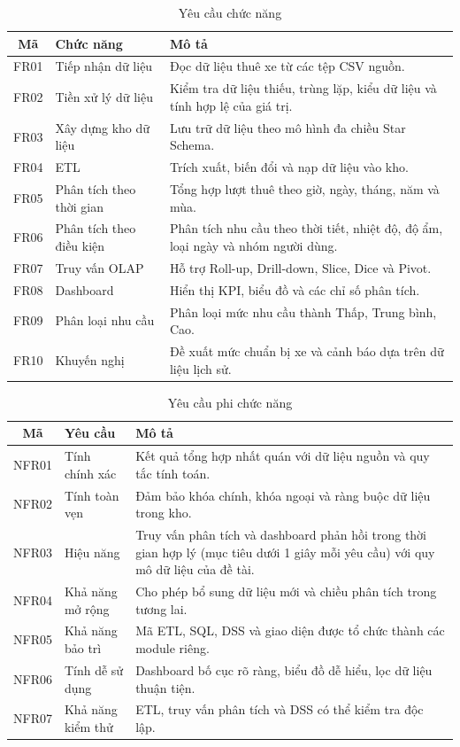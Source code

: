 \begin{table}[H]
\centering
\caption{Yêu cầu chức năng}
\label{tab:fr}
\begin{tabularx}{\textwidth}{|c|p{3.6cm}|X|}
\hline
\textbf{Mã} & \textbf{Chức năng} & \textbf{Mô tả} \\ \hline
FR01 & Tiếp nhận dữ liệu & Đọc dữ liệu thuê xe từ các tệp CSV nguồn. \\ \hline
FR02 & Tiền xử lý dữ liệu & Kiểm tra dữ liệu thiếu, trùng lặp, kiểu dữ liệu và tính hợp lệ của giá trị. \\ \hline
FR03 & Xây dựng kho dữ liệu & Lưu trữ dữ liệu theo mô hình đa chiều Star Schema. \\ \hline
FR04 & ETL & Trích xuất, biến đổi và nạp dữ liệu vào kho. \\ \hline
FR05 & Phân tích theo thời gian & Tổng hợp lượt thuê theo giờ, ngày, tháng, năm và mùa. \\ \hline
FR06 & Phân tích theo điều kiện & Phân tích nhu cầu theo thời tiết, nhiệt độ, độ ẩm, loại ngày và nhóm người dùng. \\ \hline
FR07 & Truy vấn OLAP & Hỗ trợ Roll-up, Drill-down, Slice, Dice và Pivot. \\ \hline
FR08 & Dashboard & Hiển thị KPI, biểu đồ và các chỉ số phân tích. \\ \hline
FR09 & Phân loại nhu cầu & Phân loại mức nhu cầu thành Thấp, Trung bình, Cao. \\ \hline
FR10 & Khuyến nghị & Đề xuất mức chuẩn bị xe và cảnh báo dựa trên dữ liệu lịch sử. \\ \hline
\end{tabularx}
\end{table}

\begin{table}[H]
\centering
\caption{Yêu cầu phi chức năng}
\label{tab:nfr}
\begin{tabularx}{\textwidth}{|c|p{3.4cm}|X|}
\hline
\textbf{Mã} & \textbf{Yêu cầu} & \textbf{Mô tả} \\ \hline
NFR01 & Tính chính xác & Kết quả tổng hợp nhất quán với dữ liệu nguồn và quy tắc tính toán. \\ \hline
NFR02 & Tính toàn vẹn & Đảm bảo khóa chính, khóa ngoại và ràng buộc dữ liệu trong kho. \\ \hline
NFR03 & Hiệu năng & Truy vấn phân tích và dashboard phản hồi trong thời gian hợp lý (mục tiêu dưới 1 giây mỗi yêu cầu) với quy mô dữ liệu của đề tài. \\ \hline
NFR04 & Khả năng mở rộng & Cho phép bổ sung dữ liệu mới và chiều phân tích trong tương lai. \\ \hline
NFR05 & Khả năng bảo trì & Mã ETL, SQL, DSS và giao diện được tổ chức thành các module riêng. \\ \hline
NFR06 & Tính dễ sử dụng & Dashboard bố cục rõ ràng, biểu đồ dễ hiểu, lọc dữ liệu thuận tiện. \\ \hline
NFR07 & Khả năng kiểm thử & ETL, truy vấn phân tích và DSS có thể kiểm tra độc lập. \\ \hline
\end{tabularx}
\end{table}

